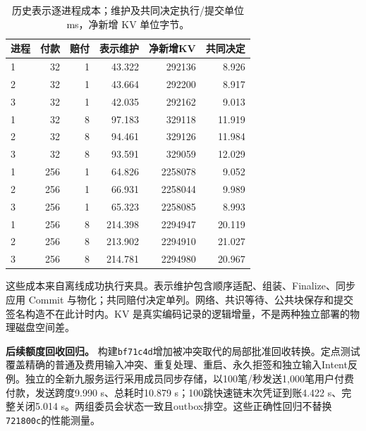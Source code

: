 \begin{table}[htbp]
\centering\small
\caption{历史表示逐进程成本；维护及共同决定执行/提交单位 ms，净新增 KV 单位字节。}
\label{tab:supp-final-reader}
\begin{tabular}{@{}lrrrrr@{}}
\toprule
进程 & 付款 & 赔付 & 表示维护 & 净新增KV & 共同决定 \\
\midrule
1 & 32 & 1 & 43.322 & 292136 & 8.926 \\
2 & 32 & 1 & 43.664 & 292200 & 8.917 \\
3 & 32 & 1 & 42.035 & 292162 & 9.013 \\
1 & 32 & 8 & 97.183 & 329118 & 11.919 \\
2 & 32 & 8 & 94.461 & 329126 & 11.984 \\
3 & 32 & 8 & 93.591 & 329059 & 12.029 \\
1 & 256 & 1 & 64.826 & 2258078 & 9.052 \\
2 & 256 & 1 & 66.931 & 2258044 & 9.989 \\
3 & 256 & 1 & 65.323 & 2258085 & 8.993 \\
1 & 256 & 8 & 214.398 & 2294947 & 20.119 \\
2 & 256 & 8 & 213.902 & 2294910 & 21.027 \\
3 & 256 & 8 & 214.781 & 2294980 & 20.967 \\
\bottomrule
\end{tabular}
\end{table}

这些成本来自离线成功执行夹具。表示维护包含顺序适配、组装、Finalize、同步应用 Commit 与物化；共同赔付决定单列。网络、共识等待、公共块保存和提交签名构造不在此计时内。KV 是真实编码记录的逻辑增量，不是两种独立部署的物理磁盘空间差。

\noindent\textbf{后续额度回收回归。}
构建\texttt{bf71c4d}增加被冲突取代的局部批准回收转换。定点测试覆盖精确的普通及费用输入冲突、重复处理、重启、永久拒签和独立输入Intent反例。独立的全新九服务运行采用成员同步存储，以100笔/秒发送1,000笔用户付费付款，发送跨度9.990 s、总耗时10.879 s；100跳快速链末次凭证到账4.422 s、完整关闭5.014 s。两组委员会状态一致且outbox排空。这些正确性回归不替换\texttt{721800c}的性能测量。
